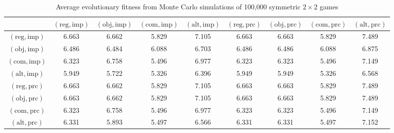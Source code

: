\documentclass[fleqn,reqno,11pt]{article}
\begin{document}
\begin{table}[]
\centering
\footnotesize
\begin{tabular}{ccccccccc}
  \hline
 & $(\text{reg}, \text{imp})$ 
 & $(\text{obj}, \text{imp})$ 
 & $(\text{com}, \text{imp})$
 & $(\text{alt}, \text{imp})$
 & $(\text{reg}, \text{prc})$ 
 & $(\text{obj}, \text{prc})$ 
 & $(\text{com}, \text{prc})$
 & $(\text{alt}, \text{prc})$ \\ 
  \hline
  $(\text{reg}, \text{imp})$ & 6.663 & 6.662 & 5.829 & 7.105 & 6.663 & 6.663 & 5.829 & 7.489 \\
  $(\text{obj}, \text{imp})$ & 6.486 & 6.484 & 6.088 & 6.703 & 6.486 & 6.486 & 6.088 & 6.875 \\
  $(\text{com}, \text{imp})$ & 6.323 & 6.758 & 5.496 & 6.977 & 6.323 & 6.323 & 5.496 & 7.149 \\
  $(\text{alt}, \text{imp})$ & 5.949 & 5.722 & 5.326 & 6.396 & 5.949 & 5.949 & 5.326 & 6.568 \\
  $(\text{reg}, \text{prc})$ & 6.663 & 6.662 & 5.829 & 7.105 & 6.663 & 6.663 & 5.829 & 7.489 \\
  $(\text{obj}, \text{prc})$ & 6.663 & 6.662 & 5.829 & 7.105 & 6.663 & 6.663 & 5.829 & 7.489 \\
  $(\text{com}, \text{prc})$ & 6.323 & 6.758 & 5.496 & 6.977 & 6.323 & 6.323 & 5.496 & 7.149 \\
  $(\text{alt}, \text{prc})$ & 6.331 & 5.893 & 5.497 & 6.566 & 6.331 & 6.331 & 5.497 & 7.152 \\
   \hline                          
\end{tabular}                      
\caption{Average evolutionary fitness from Monte Carlo simulations of 100,000 symmetric $2 \times 2$ games}
\label{tab:ExpectedFitness_2x2_Full}        
\end{table}   
 
\end{document}
